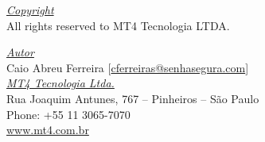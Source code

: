 \documentclass[12pt]{article}
\begin{document}
\pagebreak

\vspace*{\fill}
\begin{flushright}
	\underline{\textit{Copyright}}\\
	All rights reserved to MT4 Tecnologia LTDA.\bigskip

	\underline{\textit{Autor}}\\
	Caio Abreu Ferreira [\href{mailto:cferreira@senhasegura.com}{cferreiras@senhasegura.com}] \bigskip\\
	
	\underline{\textit{MT4 Tecnologia Ltda.}}\\
	Rua Joaquim Antunes, 767 – Pinheiros – São Paulo\\
	Phone: +55 11 3065-7070\\
	\url{www.mt4.com.br}\\
\end{flushright}
\end{document}
